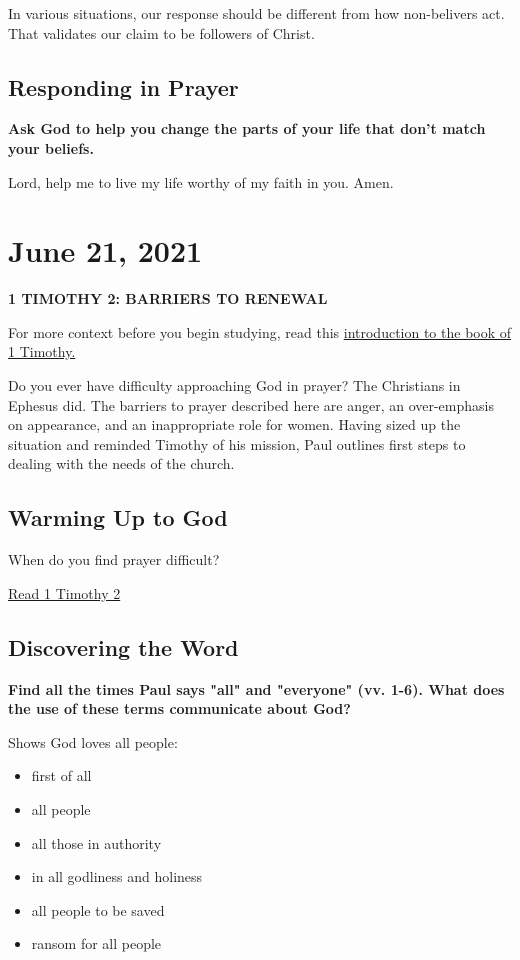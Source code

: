 \documentclass[11pt]{article}
\begin{document}
In various situations, our response should be different from how non-belivers act. That validates our claim to be followers of Christ.

\subsection{Responding in Prayer}
\label{sec:orgfb07818}

\textbf{\textbf{Ask God to help you change the parts of your life that don't match your beliefs.}}

Lord, help me to live my life worthy of my faith in you. Amen.


\section{June 21, 2021}
\label{sec:org5ad3a2d}

\textbf{\textbf{1 TIMOTHY 2: BARRIERS TO RENEWAL}}

For more context before you begin studying, read this \href{https://www.ivpress.com/daily-bible-study/introducing-1-timothy}{introduction to the book of 1 Timothy.}

Do you ever have difficulty approaching God in prayer? The Christians
in Ephesus did. The barriers to prayer described here are anger, an
over-emphasis on appearance, and an inappropriate role for
women. Having sized up the situation and reminded Timothy of his
mission, Paul outlines first steps to dealing with the needs of the
church.

\subsection{Warming Up to God}
\label{sec:org2f4a0fe}

When do you find prayer difficult?

\href{https://www.biblegateway.com/passage/?search=1\%20Timothy\%202\&version=NIV\&interface=print}{Read 1 Timothy 2}

\subsection{Discovering the Word}
\label{sec:org1a6dc77}

\textbf{\textbf{Find all the times Paul says "all" and "everyone" (vv. 1-6). What does the use of these terms communicate about God?}}

Shows God loves all people:
\begin{itemize}
\item first of all
\item all people
\item all those in authority
\item in all godliness and holiness
\item all people to be saved
\item ransom for all people
\end{itemize}
\end{document}
